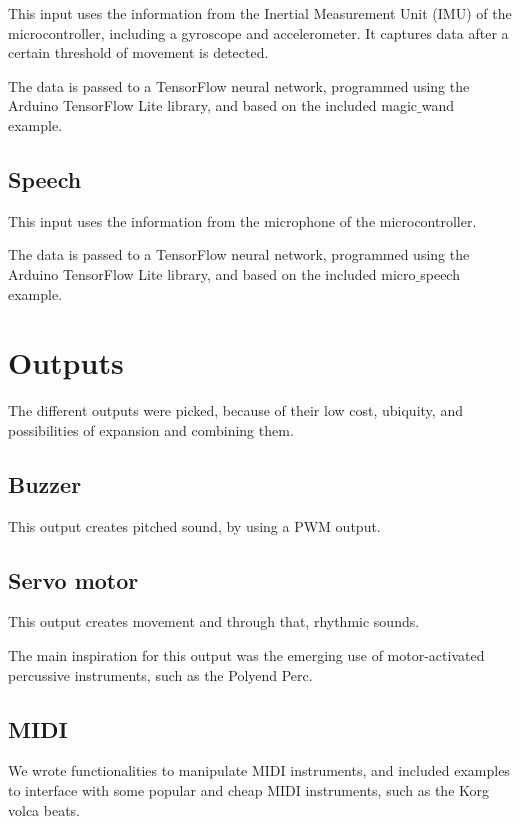 This input uses the information from the Inertial Measurement Unit (IMU) of the microcontroller, including a gyroscope and accelerometer. It captures data after a certain threshold of movement is detected.

The data is passed to a TensorFlow neural network, programmed using the Arduino TensorFlow Lite library, and based on the included magic$\_$wand example.

\subsection{Speech}

This input uses the information from the microphone of the microcontroller.

The data is passed to a TensorFlow neural network, programmed using the Arduino TensorFlow Lite library, and based on the included micro$\_$speech example.

\section{Outputs}

The different outputs were picked, because of their low cost, ubiquity, and possibilities of expansion and combining them.

\subsection{Buzzer}

This output creates pitched sound, by using a PWM output.

\subsection{Servo motor}

This output creates movement and through that, rhythmic sounds.

The main inspiration for this output was the emerging use of motor-activated percussive instruments, such as the Polyend Perc.

\subsection{MIDI}

We wrote functionalities to manipulate MIDI instruments, and included examples to interface with some popular and cheap MIDI instruments, such as the Korg volca beats.

